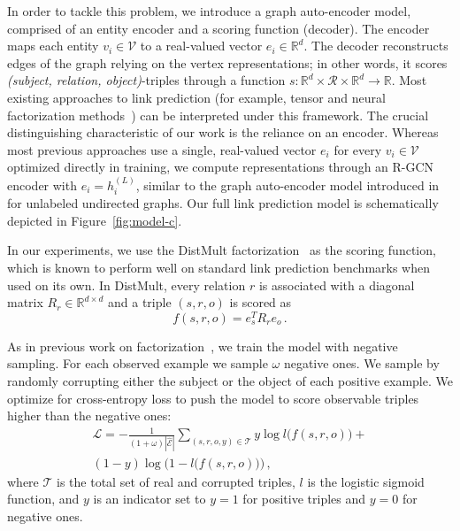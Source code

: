 \documentclass[letterpaper]{article} \usepackage{aaai18}  \usepackage{times}  \usepackage{helvet}  \usepackage{courier}  \usepackage{url}  \usepackage{graphicx}  \frenchspacing
\newcommand{\citet}[1]{\citeauthor{#1}~\shortcite{#1}}
\begin{document}
In order to tackle this problem, we introduce a graph auto-encoder model, comprised of an entity encoder and a scoring function (decoder). The encoder maps each entity $v_i \in \mathcal{V}$ to a real-valued vector $e_i \in \mathbb{R}^d$. The decoder reconstructs edges of the graph relying on the vertex representations; in other words, it scores \textit{(subject, relation, object)}-triples through a function $s: \mathbb{R}^d \times \mathcal{R} \times \mathbb{R}^d \to \mathbb{R}$. Most existing approaches to link prediction (for example, tensor and neural factorization methods~\cite{socher2013reasoning,lin2015modeling,toutanova2016compositional,distmult-embedding_entities_and_relations,complex-complex_embeddings_for_simple_link_prediction}) can be interpreted under this framework. The crucial distinguishing characteristic of our work is the reliance on an encoder. Whereas most previous approaches use a single, real-valued vector $e_i$ for every $v_i \in \mathcal{V}$ optimized directly in training, we compute representations through an R-GCN encoder with $e_i = h_i^{(L)}$, similar to the graph auto-encoder model introduced in \citet{kipf2016variational} for unlabeled undirected graphs.
Our full link prediction model is schematically depicted in Figure~\ref{fig:model-c}.

In our experiments, we use the DistMult factorization~\cite{distmult-embedding_entities_and_relations} as the scoring function, which is known to perform well on standard link prediction benchmarks when used on its own.
In DistMult, every relation $r$ is associated with a diagonal matrix $R_r
\in \mathbb{R}^{d \times d}$ and a triple $(s, r, o)$ is scored as
\begin{equation}
f(s, r, o) = e_s^T R_r e_o \, .
\end{equation}

As in  previous work on factorization~\cite{distmult-embedding_entities_and_relations,complex-complex_embeddings_for_simple_link_prediction}, we train the model with negative sampling. For each observed example we sample $\omega$ negative ones. We sample by randomly corrupting either the subject or the object of each positive example.
We optimize for cross-entropy loss to push the model to score observable triples higher than the negative ones:
\begin{equation}
\begin{split}
\mathcal{L} = - \frac{1}{ (1+\omega) |\mathcal{\hat{E}}|}\sum\limits_{(s,r,o,y) \in \mathcal{T}} y \log l\bigl(f(s,r,o)\bigr) + \\
(1-y) \log\bigl(1-l\bigl(f(s,r,o)\bigr)\bigr) \, ,
\end{split}
\end{equation}
where $\mathcal{T}$ is the total set of real and corrupted triples, $l$ is the logistic sigmoid function, and $y$ is an indicator set to $y=1$ for positive triples and $y=0$ for negative ones.
 
\end{document}
